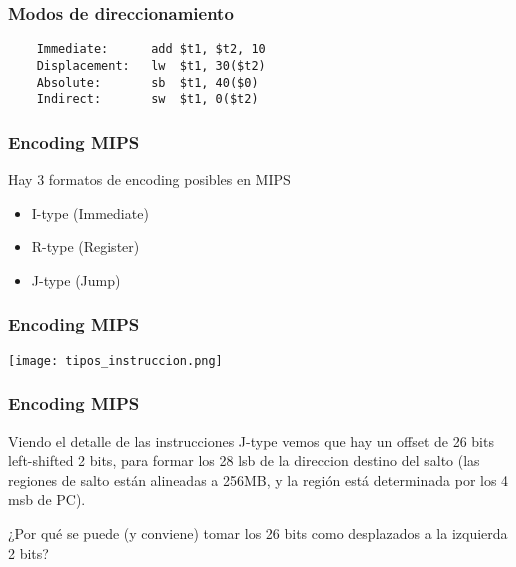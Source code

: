 \documentclass{beamer}
\begin{document}
\begin{frame}[fragile]
\frametitle{Modos de direccionamiento}

\begin{lstlisting}
    Immediate:		add	$t1, $t2, 10	
    Displacement:	lw	$t1, 30($t2)
    Absolute:		sb	$t1, 40($0)
    Indirect:		sw	$t1, 0($t2)
\end{lstlisting}
\end{frame}


\begin{frame}
 \frametitle{Encoding MIPS} 
 Hay 3 formatos de encoding posibles en MIPS
 \begin{itemize}
  \item I-type (Immediate)
  \item R-type (Register)
  \item J-type (Jump)
 \end{itemize}
\end{frame}

\begin{frame}
 \frametitle{Encoding MIPS} 
 
 \begin{center}
 \texttt{[image: tipos\_instruccion.png]}
\end{center}
 \end{frame}


\begin{frame}
 \frametitle{Encoding MIPS} 

 Viendo el detalle de las instrucciones J-type vemos que hay un offset de 26 bits left-shifted 2 bits, para formar los 28 lsb de la direccion destino del salto (las regiones de salto están alineadas a 256MB, y la región está determinada por los 4 msb de PC).
 
 \bigskip

 ¿Por qué se puede (y conviene) tomar los 26 bits como desplazados a la izquierda 2 bits?
\end{frame}

     
\end{document}
